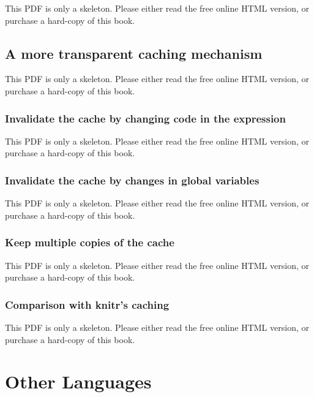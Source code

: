 \documentclass[
  11pt,
]{krantz}
\begin{document}
This PDF is only a skeleton. Please either read the free online HTML version, or purchase a hard-copy of this book.

\section{A more transparent caching mechanism}\label{cache-rds}

This PDF is only a skeleton. Please either read the free online HTML version, or purchase a hard-copy of this book.

\subsection{Invalidate the cache by changing code in the expression}\label{invalidate-the-cache-by-changing-code-in-the-expression}

This PDF is only a skeleton. Please either read the free online HTML version, or purchase a hard-copy of this book.

\subsection{Invalidate the cache by changes in global variables}\label{invalidate-the-cache-by-changes-in-global-variables}

This PDF is only a skeleton. Please either read the free online HTML version, or purchase a hard-copy of this book.

\subsection{Keep multiple copies of the cache}\label{keep-multiple-copies-of-the-cache}

This PDF is only a skeleton. Please either read the free online HTML version, or purchase a hard-copy of this book.

\subsection{\texorpdfstring{Comparison with \textbf{knitr}'s caching}{Comparison with knitr's caching}}\label{comparison-with-knitrs-caching}

This PDF is only a skeleton. Please either read the free online HTML version, or purchase a hard-copy of this book.

\chapter{Other Languages}\label{other-languages}
\end{document}
